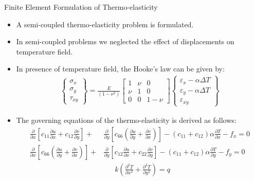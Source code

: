 \documentclass{beamer}
\begin{document}
\begin{frame}[t,fragile]{Finite Element Formulation of Thermo-elasticity}
    \vspace{-.4cm}
    \begin{itemize} 
\item A semi-coupled thermo-elasticity problem is formulated. 
\item In semi-coupled problems we neglected the effect of displacements on temperature field. 
\item In presence of temperature field, the Hooke's law can be given by: 
    \footnotesize
\begin{align*}
    \begin{Bmatrix}
        \sigma_{x}\\ \sigma_{y}\\ \tau_{xy} 
    \end{Bmatrix} =\frac{E}{(1-\nu^2)}
    \begin{bmatrix}
        1 & \nu & 0 \\ \nu & 1 & 0 \\ 0 & 0 & 1-\nu 
    \end{bmatrix}
    \begin{Bmatrix}
        \varepsilon_{x}-\alpha\Delta T \\ \varepsilon_{y}-\alpha \Delta T \\ \varepsilon_{xy} 
    \end{Bmatrix}
\end{align*}

    \item The governing equations of the thermo-elasticity is derived as follows: 
            \bgroup
            \begin{align*}
    \frac{\partial}{\partial x}\left[c_{11}\frac{\partial u}{\partial x}+c_{12}\frac{\partial v}{\partial y}\right]+&\frac{\partial}{\partial y}\left[c_{66}\left(\frac{\partial u}{\partial y}+\frac{\partial v}{\partial x}\right)\right]-(c_{11}+c_{12})\alpha\frac{\partial T}{\partial x}-f_x   =0 \\
    \frac{\partial}{\partial x}\left[c_{66}\left(\frac{\partial u}{\partial y}+\frac{\partial v}{\partial x}\right)\right]+&\frac{\partial}{\partial y}\left[c_{12}\frac{\partial u}{\partial x}+c_{22}\frac{\partial v}{\partial y}\right]-(c_{11}+c_{12})\alpha\frac{\partial T}{\partial y}-f_y=0\\
    &\ \ \ \ \ \ \ k\left( \frac{\partial^2 T}{\partial x^2}+\frac{\partial^2 T}{\partial y^2} \right)=q
\end{align*}
\egroup
       \end{itemize}
\end{frame}
\end{document}
